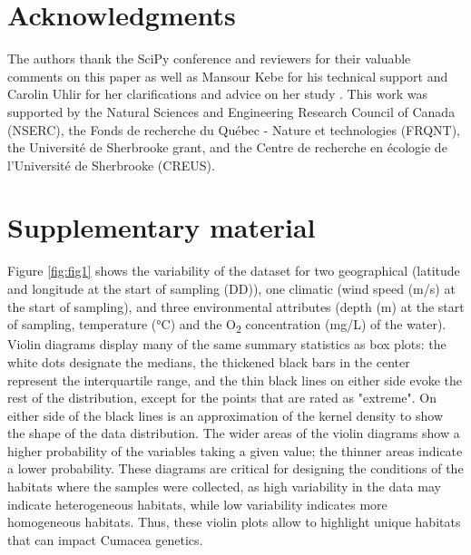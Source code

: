 \section{Acknowledgments}\label{acknowledgments}

The authors thank the SciPy conference and reviewers for their valuable comments on this paper as well as Mansour Kebe for his technical support and Carolin Uhlir for her clarifications and advice on her study \citep{uhlir_adding_2021}. This work was supported by the Natural Sciences and Engineering Research Council of Canada (NSERC), the Fonds de recherche du Québec - Nature et technologies (FRQNT), the Université de Sherbrooke grant, and the Centre de recherche en écologie de l’Université de Sherbrooke (CREUS).

\appendix


\section*{Supplementary material}

Figure \ref{fig:fig1} shows the variability of the dataset for two geographical (latitude and longitude at the start of sampling (DD)), one climatic (wind speed (m/s) at the start of sampling), and three environmental attributes (depth (m) at the start of sampling, temperature (°C) and the O\textsubscript{2}  concentration (mg/L) of the water). Violin diagrams display many of the same summary statistics as box plots: the white dots designate the medians, the thickened black bars in the center represent the interquartile range, and the thin black lines on either side evoke the rest of the distribution, except for the points that are rated as "extreme". On either side of the black lines is an approximation of the kernel density to show the shape of the data distribution. The wider areas of the violin diagrams show a higher probability of the variables taking a given value; the thinner areas indicate a lower probability. These diagrams are critical for designing the conditions of the habitats where the samples were collected, as high variability in the data may indicate heterogeneous habitats, while low variability indicates more homogeneous habitats. Thus, these violin plots allow to highlight unique habitats that can impact Cumacea genetics.


